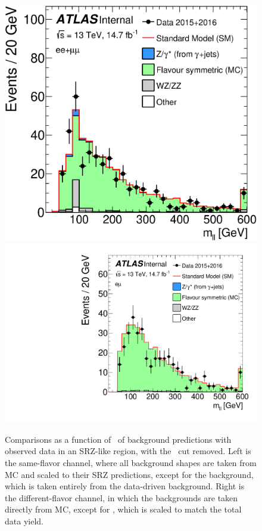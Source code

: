 \begin{centering}
\begin{figure}[!hbt]
\myfloatalign
\includegraphics[width=.48\linewidth]{figures/results/mll_SF_R_a_SCALED.eps}
\includegraphics[width=.48\linewidth]{figures/results/mll_DF_R_a_SCALED.pdf}
\caption{Comparisons as a function of \mll~of background predictions with observed data in an SRZ-like region, with the \mll~cut removed. Left is the same-flavor channel, where all background shapes are taken from \ac{MC} and scaled to their SRZ predictions, except for the \dyjets background, which is taken entirely from the data-driven background. Right is the different-flavor channel, in which the backgrounds are taken directly from \ac{MC}, except for \ttbar, which is scaled to match the total data yield. }
\label{fig:results_widemll}
\end{figure}
\end{centering}

